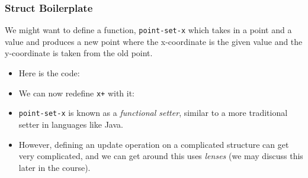 \documentclass{beamer}
\begin{document}


\begin{frame}
  \frametitle{Struct Boilerplate}
  We might want to define a function, \texttt{point-set-x} which takes in a point and a value
  and produces a new point where the x-coordinate is the given value and the y-coordinate is taken from the old point.
  \begin{itemize}
  \item<2-> Here is the code: \pointSet
  \item<3-> We can now redefine \texttt{x+} with it:
    \xPlusNew
  \item<4-> \texttt{point-set-x} is  known as
    a \emph{functional setter}, similar to a more traditional setter
    in languages like Java.
  \item<5-> However, defining an update operation on a complicated
    structure can get very complicated, and we can get around
    this uses \emph{lenses} (we may discuss this later in the course).
  \end{itemize}  
\end{frame}



\end{document}
